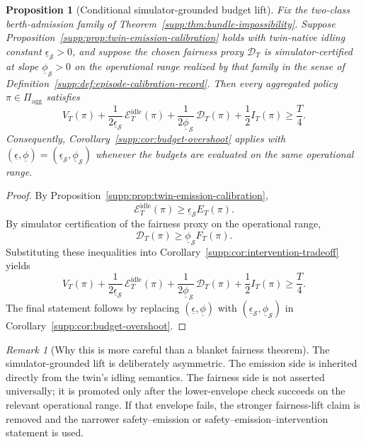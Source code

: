 \documentclass[11pt]{article}
\newcommand{\1}{\mathbf{1}}
\theoremstyle{definition}
\theoremstyle{plain}
\newtheorem{proposition}[definition]{Proposition}
\theoremstyle{remark}
\newtheorem{remark}[definition]{Remark}
\begin{document}
\begin{proposition}[Conditional simulator-grounded budget lift]
\label{supp:prop:sim-grounded-budget-lift}
Fix the two-class berth-admission family of Theorem~\ref{supp:thm:bundle-impossibility}. Suppose Proposition~\ref{supp:prop:twin-emission-calibration} holds with twin-native idling constant $\underline\epsilon_{\mathcal S}>0$, and suppose the chosen fairness proxy $\mathcal D_T$ is simulator-certified at slope $\underline\phi_{\mathcal S}>0$ on the operational range realized by that family in the sense of Definition~\ref{supp:def:episode-calibration-record}. Then every aggregated policy $\pi\in\Pi_{\mathrm{agg}}$ satisfies
\[
V_T(\pi)
+ \frac{1}{2\underline\epsilon_{\mathcal S}}\,\mathcal E_T^{\mathrm{idle}}(\pi)
+ \frac{1}{2\underline\phi_{\mathcal S}}\,\mathcal D_T(\pi)
+ \frac{1}{2} I_T(\pi)
\ge \frac{T}{4}.
\]
Consequently, Corollary~\ref{supp:cor:budget-overshoot} applies with $(\underline\epsilon,\underline\phi)=(\underline\epsilon_{\mathcal S},\underline\phi_{\mathcal S})$ whenever the budgets are evaluated on the same operational range.
\end{proposition}

\begin{proof}
By Proposition~\ref{supp:prop:twin-emission-calibration},
\[
\mathcal E_T^{\mathrm{idle}}(\pi)
\ge
\underline\epsilon_{\mathcal S} E_T(\pi).
\]
By simulator certification of the fairness proxy on the operational range,
\[
\mathcal D_T(\pi)
\ge
\underline\phi_{\mathcal S} F_T(\pi).
\]
Substituting these inequalities into Corollary~\ref{supp:cor:intervention-tradeoff} yields
\[
V_T(\pi)
+ \frac{1}{2\underline\epsilon_{\mathcal S}}\,\mathcal E_T^{\mathrm{idle}}(\pi)
+ \frac{1}{2\underline\phi_{\mathcal S}}\,\mathcal D_T(\pi)
+ \frac{1}{2} I_T(\pi)
\ge \frac{T}{4}.
\]
The final statement follows by replacing $(\underline\epsilon,\underline\phi)$ with $(\underline\epsilon_{\mathcal S},\underline\phi_{\mathcal S})$ in Corollary~\ref{supp:cor:budget-overshoot}.
\end{proof}

\begin{remark}[Why this is more careful than a blanket fairness theorem]
\label{supp:rem:sim-grounded-caution}
The simulator-grounded lift is deliberately asymmetric. The emission side is inherited directly from the twin's idling semantics. The fairness side is not asserted universally; it is promoted only after the lower-envelope check succeeds on the relevant operational range. If that envelope fails, the stronger fairness-lift claim is removed and the narrower safety--emission or safety--emission--intervention statement is used.
\end{remark}
\end{document}
